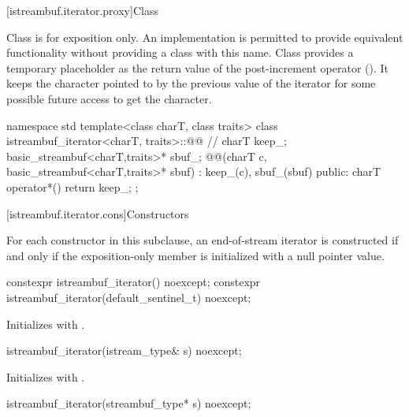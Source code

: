 [istreambuf.iterator.proxy]{Class }

\pnum
Class
is for exposition only.
An implementation is permitted to provide equivalent functionality without
providing a class with this name.
Class
provides a temporary
placeholder as the return value of the post-increment operator
().
It keeps the character pointed to by the previous value
of the iterator for some possible future access to get the character.

%
\begin{codeblock}
namespace std {
  template<class charT, class traits>
  class istreambuf_iterator<charT, traits>::@@ { // \expos
    charT keep_;
    basic_streambuf<charT,traits>* sbuf_;
    @@(charT c, basic_streambuf<charT,traits>* sbuf)
      : keep_(c), sbuf_(sbuf) { }
  public:
    charT operator*() { return keep_; }
  };
}
\end{codeblock}

[istreambuf.iterator.cons]{Constructors}

\pnum
For each  constructor in this subclause,
an end-of-stream iterator is constructed if and only if
the exposition-only member  is initialized with a null pointer value.


%
\begin{itemdecl}
constexpr istreambuf_iterator() noexcept;
constexpr istreambuf_iterator(default_sentinel_t) noexcept;
\end{itemdecl}

\begin{itemdescr}
\pnum
\effects
Initializes  with .
\end{itemdescr}


%
\begin{itemdecl}
istreambuf_iterator(istream_type& s) noexcept;
\end{itemdecl}

\begin{itemdescr}
\pnum
\effects
Initializes  with .
\end{itemdescr}


%
\begin{itemdecl}
istreambuf_iterator(streambuf_type* s) noexcept;
\end{itemdecl}


